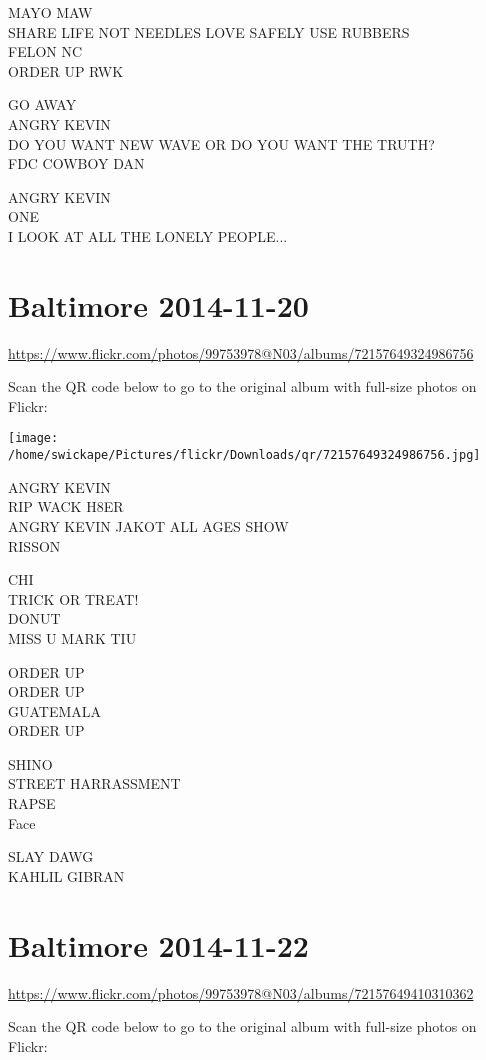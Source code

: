 \documentclass[10pt,letterpaper]{article}
\begin{document}
MAYO MAW\\
SHARE LIFE NOT NEEDLES LOVE SAFELY USE RUBBERS\\
FELON NC\\
ORDER UP RWK

GO AWAY\\
ANGRY KEVIN\\
DO YOU WANT NEW WAVE OR DO YOU WANT THE TRUTH?\\
FDC COWBOY DAN

ANGRY KEVIN\\
ONE\\
I LOOK AT ALL THE LONELY PEOPLE...


\section*{Baltimore 2014-11-20}

\url{https://www.flickr.com/photos/99753978@N03/albums/72157649324986756}

Scan the QR code below to go to the original album with full-size photos on Flickr:

\texttt{[image: /home/swickape/Pictures/flickr/Downloads/qr/72157649324986756.jpg]}


ANGRY KEVIN\\
RIP WACK H8ER\\
ANGRY KEVIN JAKOT ALL AGES SHOW\\
RISSON

CHI\\
TRICK OR TREAT!\\
DONUT\\
MISS U MARK TIU

ORDER UP\\
ORDER UP\\
GUATEMALA\\
ORDER UP

SHINO\\
STREET HARRASSMENT\\
RAPSE\\
Face

SLAY DAWG\\
KAHLIL GIBRAN


\section*{Baltimore 2014-11-22}

\url{https://www.flickr.com/photos/99753978@N03/albums/72157649410310362}

Scan the QR code below to go to the original album with full-size photos on Flickr:
\end{document}
